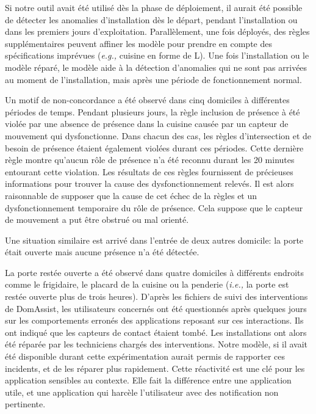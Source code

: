 Si notre outil avait été utilisé dès la phase de déploiement, il aurait été possible de détecter les anomalies d'installation dès le départ, pendant l'installation ou dans les premiers jours d'exploitation. Parallèlement, une fois déployés, des règles supplémentaires peuvent affiner les modèle pour prendre en compte des spécifications imprévues ({\em e.g.,} cuisine en forme de L). Une fois l'installation ou le modèle réparé, le modèle aide à la détection d'anomalies qui ne sont pas arrivées au moment de l'installation, mais après une période de fonctionnement normal.

Un motif de non-concordance a été observé dans cinq domiciles à différentes périodes de temps. Pendant plusieurs jours, la règle inclusion de présence à été violée par une absence de présence dans la cuisine causée par un capteur de mouvement qui dysfonctionne. Dans chacun des cas, les règles d'intersection et de besoin de présence étaient également violées durant ces périodes. Cette dernière règle montre qu'aucun rôle de présence n'a été reconnu durant les 20 minutes entourant cette violation. Les résultats de ces règles fournissent de précieuses informations pour trouver la cause des dysfonctionnement relevés. Il est alors raisonnable de supposer que la cause de cet échec de la règles et un dysfonctionnement temporaire du rôle de présence. Cela suppose que le capteur de mouvement a put être obstrué ou mal orienté. 

Une situation similaire est arrivé dans l'entrée de deux autres domicile: la porte était ouverte mais aucune présence n'a été détectée.

La porte restée ouverte a été observé dans quatre domiciles à différents endroits comme le frigidaire, le placard de la cuisine ou la penderie ({\em i.e.,} la porte est restée ouverte plus de trois heures). D'après les fichiers de suivi des interventions de DomAssist, les utilisateurs concernés ont été questionnés après quelques jours sur les comportements erronés des applications reposant sur ces interactions. Ils ont indiqué que les capteurs de contact étaient tombé. Les installations ont alors été réparée par les techniciens chargés des interventions. Notre modèle, si il avait été disponible durant cette expérimentation aurait permis de rapporter ces incidents, et de les réparer plus rapidement. Cette réactivité est une clé pour les application sensibles au contexte. Elle fait la différence entre une application utile, et une application qui harcèle l'utilisateur avec des notification non pertinente.


